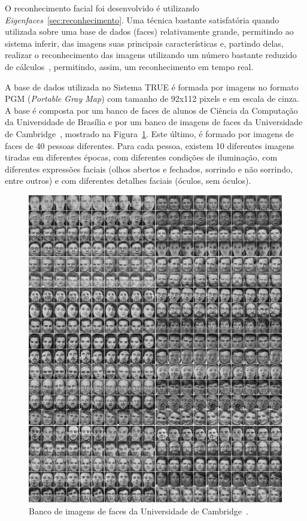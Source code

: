 		O reconhecimento facial foi desenvolvido é utilizando
		\textit{Eigenfaces}~\ref{sec:reconhecimento}. Uma técnica bastante
		satisfatória quando utilizada sobre uma base de dados (faces) relativamente
		grande, permitindo ao sistema inferir, das imagens suas principais
		características e, partindo delas, realizar o reconhecimento das imagens
		utilizando um número bastante reduzido de cálculos~\cite{artigo-eigenface},
		permitindo, assim, um reconhecimento em tempo real.

		A base de dados utilizada no Sistema TRUE é formada por imagens no formato PGM (\textit{Portable Gray Map}) com tamanho de 92x112 pixels e em escala de cinza. A base é composta por um banco de faces de alunos de Ciência da Computação da Universidade de Brasília e por um banco de imagens de faces da Universidade de Cambridge~\cite{cambridgeFaceDb}, mostrado na Figura~\ref{fig:cambridgeFaceDb}. Este último, é formado por imagens de faces de 40 pessoas diferentes. Para cada pessoa, existem 10 diferentes imagens tiradas em diferentes épocas, com diferentes condições de iluminação, com diferentes expressões faciais (olhos abertos e fechados, sorrindo e não sorrindo, entre outros) e com diferentes detalhes faciais (óculos, sem óculos). 

		\begin{figure}[H]
			\begin{center}
				\includegraphics[scale=0.4]{figuras/4.ProblemaEProposta/cambrigdefacedb.png}
			\end{center}
			\caption{Banco de imagens de faces da Universidade de Cambridge~\cite{cambridgeFaceDb}.}
			\label{fig:cambridgeFaceDb}
		\end{figure}

